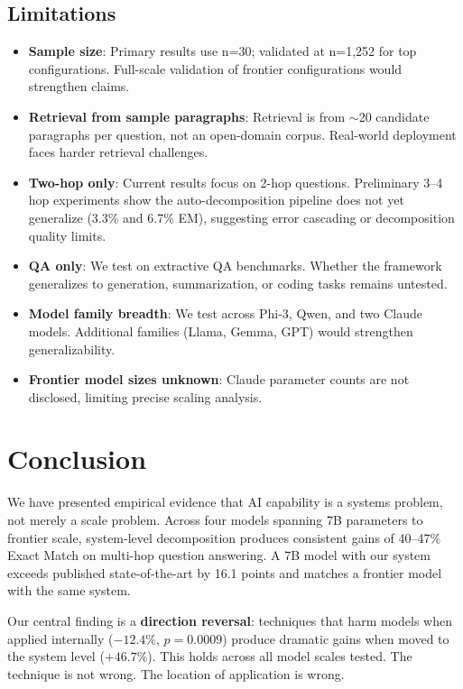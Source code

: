 \documentclass[11pt]{article}
\begin{document}
\subsection{Limitations}

\begin{itemize}[nosep]
    \item \textbf{Sample size}: Primary results use n=30; validated at n=1,252 for top configurations. Full-scale validation of frontier configurations would strengthen claims.
    \item \textbf{Retrieval from sample paragraphs}: Retrieval is from $\sim$20 candidate paragraphs per question, not an open-domain corpus. Real-world deployment faces harder retrieval challenges.
    \item \textbf{Two-hop only}: Current results focus on 2-hop questions. Preliminary 3--4 hop experiments show the auto-decomposition pipeline does not yet generalize (3.3\% and 6.7\% EM), suggesting error cascading or decomposition quality limits.
    \item \textbf{QA only}: We test on extractive QA benchmarks. Whether the framework generalizes to generation, summarization, or coding tasks remains untested.
    \item \textbf{Model family breadth}: We test across Phi-3, Qwen, and two Claude models. Additional families (Llama, Gemma, GPT) would strengthen generalizability.
    \item \textbf{Frontier model sizes unknown}: Claude parameter counts are not disclosed, limiting precise scaling analysis.
\end{itemize}

\section{Conclusion}
\label{sec:conclusion}

We have presented empirical evidence that AI capability is a systems problem, not merely a scale problem. Across four models spanning 7B parameters to frontier scale, system-level decomposition produces consistent gains of 40--47\% Exact Match on multi-hop question answering. A 7B model with our system exceeds published state-of-the-art by 16.1 points and matches a frontier model with the same system.

Our central finding is a \textbf{direction reversal}: techniques that harm models when applied internally ($-12.4\%$, $p=0.0009$) produce dramatic gains when moved to the system level ($+46.7\%$). This holds across all model scales tested. The technique is not wrong. The location of application is wrong.
\end{document}
